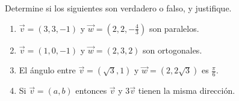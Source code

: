 Determine si los siguientes son verdadero o falso, y justifique.
\begin{enumerate}
\item $\vec v = \left(3,3,-1\right)$ y $\vec w=\left(2,2,-\frac43\right)$ son paralelos.
\item $\vec v = (1,0,-1)$ y $\vec w=(2,3,2)$ son ortogonales.
\item El \'angulo entre $\vec v=(\sqrt 3,1)$ y $\vec w=(2,2\sqrt 3)$ es $\frac\pi6$.
\item Si $\vec v = (a,b)$ entonces $\vec v$ y $3\vec v$ tienen la misma direcci\'on.
\end{enumerate}
